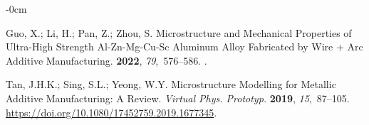 \documentclass[metals,article,accept,pdftex,moreauthors]{Definitions/mdpi}
\begin{document}
\begin{adjustwidth}{-\extralength}{0cm}
\begin{thebibliography}{999}
Guo, X.; Li, H.; Pan, Z.; Zhou, S.
\newblock Microstructure and Mechanical Properties of Ultra-High Strength
  {{Al-Zn-Mg-Cu-Sc}} Aluminum Alloy Fabricated by Wire + Arc Additive
  Manufacturing.
 {\bf 2022}, {\em
  79},~576--586.
.

Tan, J.H.K.; Sing, S.L.; Yeong, W.Y.
Microstructure Modelling for Metallic Additive Manufacturing: A Review.
{\em Virtual Phys. Prototyp.} {\bf 2019}, {\em 15},~87--105.
{\url{https://doi.org/10.1080/17452759.2019.1677345}}.

\end{thebibliography}


\PublishersNote{}
\end{adjustwidth}
\end{document}
